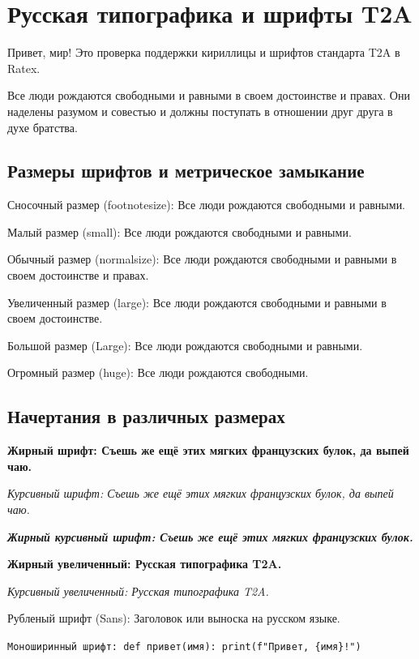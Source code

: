 \documentclass{article}
\begin{document}
\section{Русская типографика и шрифты T2A}

Привет, мир! Это проверка поддержки кириллицы и шрифтов стандарта T2A в Ratex.

Все люди рождаются свободными и равными в своем достоинстве и правах.
Они наделены разумом и совестью и должны поступать в отношении друг друга в духе братства.

\subsection{Размеры шрифтов и метрическое замыкание}

{\footnotesize Сносочный размер (footnotesize): Все люди рождаются свободными и равными.}

{\small Малый размер (small): Все люди рождаются свободными и равными.}

{\normalsize Обычный размер (normalsize): Все люди рождаются свободными и равными в своем достоинстве и правах.}

{\large Увеличенный размер (large): Все люди рождаются свободными и равными в своем достоинстве.}

{\Large Большой размер (Large): Все люди рождаются свободными и равными.}

{\huge Огромный размер (huge): Все люди рождаются свободными.}

\subsection{Начертания в различных размерах}

\normalsize
\textbf{Жирный шрифт: Съешь же ещё этих мягких французских булок, да выпей чаю.}

\textit{Курсивный шрифт: Съешь же ещё этих мягких французских булок, да выпей чаю.}

\textbf{\textit{Жирный курсивный шрифт: Съешь же ещё этих мягких французских булок.}}

\large
\textbf{Жирный увеличенный: Русская типографика T2A.}

\textit{Курсивный увеличенный: Русская типографика T2A.}

\normalsize
\textsf{Рубленый шрифт (Sans): Заголовок или выноска на русском языке.}

\texttt{Моноширинный шрифт: def привет(имя): print(f"Привет, \{имя\}!")}
\end{document}
